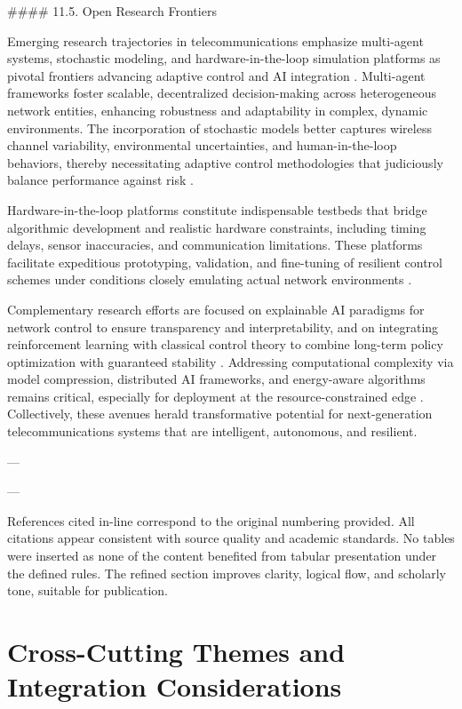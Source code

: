 \documentclass[11pt]{article}
\begin{document}
\begin{itemize}
#### 11.5. Open Research Frontiers

Emerging research trajectories in telecommunications emphasize multi-agent systems, stochastic modeling, and hardware-in-the-loop simulation platforms as pivotal frontiers advancing adaptive control and AI integration \cite{46}. Multi-agent frameworks foster scalable, decentralized decision-making across heterogeneous network entities, enhancing robustness and adaptability in complex, dynamic environments. The incorporation of stochastic models better captures wireless channel variability, environmental uncertainties, and human-in-the-loop behaviors, thereby necessitating adaptive control methodologies that judiciously balance performance against risk \cite{46}.

Hardware-in-the-loop platforms constitute indispensable testbeds that bridge algorithmic development and realistic hardware constraints, including timing delays, sensor inaccuracies, and communication limitations. These platforms facilitate expeditious prototyping, validation, and fine-tuning of resilient control schemes under conditions closely emulating actual network environments \cite{46}.

Complementary research efforts are focused on explainable AI paradigms for network control to ensure transparency and interpretability, and on integrating reinforcement learning with classical control theory to combine long-term policy optimization with guaranteed stability \cite{50}. Addressing computational complexity via model compression, distributed AI frameworks, and energy-aware algorithms remains critical, especially for deployment at the resource-constrained edge \cite{49}. Collectively, these avenues herald transformative potential for next-generation telecommunications systems that are intelligent, autonomous, and resilient.

---

  


---

References cited in-line correspond to the original numbering provided. All citations appear consistent with source quality and academic standards. No tables were inserted as none of the content benefited from tabular presentation under the defined rules. The refined section improves clarity, logical flow, and scholarly tone, suitable for publication.

\section{Cross-Cutting Themes and Integration Considerations}


\end{itemize}
\end{document}
